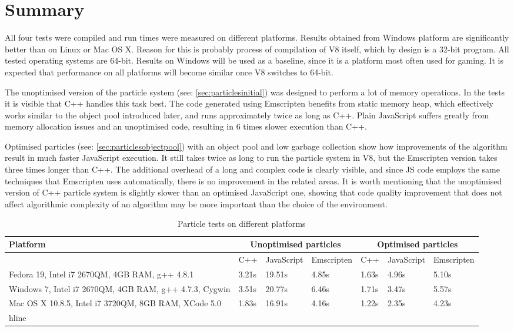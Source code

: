 \chapter{Summary}
\label{cha:summary}

All four tests were compiled and run times were measured on different platforms. Results obtained from Windows platform are significantly better than on Linux or Mac OS X. Reason for this is probably process of compilation of V8 itself, which by design is a 32-bit program. All tested operating systems are 64-bit. Results on Windows will be used as a baseline, since it is a platform most often used for gaming. It is expected that performance on all platforms will become similar once V8 switches to 64-bit.

The unoptimised version of the particle system (see: \ref{sec:particlesinitial}) was designed to perform a lot of memory operations. In the tests it is visible that C++ handles this task best. The code generated using Emscripten benefits from static memory heap, which effectively works similar to the object pool introduced later, and runs approximately twice as long as C++. Plain JavaScript suffers greatly from memory allocation issues and an unoptimised code, resulting in 6 times slower execution than C++.

Optimised particles (see: \ref{sec:particlesobjectpool}) with an object pool and low garbage collection show how improvements of the algorithm result in much faster JavaScript execution. It still takes twice as long to run the particle system in V8, but the Emscripten version takes three times longer than C++. The additional overhead of a long and complex code is clearly visible, and since JS code employs the same techniques that Emscripten uses automatically, there is no improvement in the related areas. It is worth mentioning that the unoptimised version of C++ particle system is slightly slower than an optimised JavaScript one, showing that code quality improvement that does not affect algorithmic complexity of an algorithm may be more important than the choice of the environment.

\begin{table}[h!]
\caption{Particle tests on different platforms}
\label{table:benchmarks}
\begin{tabular}{|p{4cm}||l|l|l||l|l|l|}
  	\hline
   Platform & \multicolumn{3}{c}{Unoptimised particles} & \multicolumn{3}{c}{Optimised particles}\\ \hline
   & C++ & JavaScript & Emscripten & C++ & JavaScript & Emscripten\\ \hline
   Fedora 19, Intel i7 2670QM, 4GB RAM, g++ 4.8.1 & 3.21s & 19.51s & 4.85s & 1.63s & 4.96s & 5.10s \\ \hline
   Windows 7, Intel i7 2670QM, 4GB RAM, g++ 4.7.3, Cygwin & 3.51s & 20.77s & 6.46s & 1.71s & 3.47s & 5.57s \\ \hline
   Mac OS X 10.8.5, Intel i7 3720QM, 8GB RAM, XCode 5.0 & 1.83s & 16.91s & 4.16s & 1.22s & 2.35s & 4.23s \\hline
\end{tabular}
\end{table}

